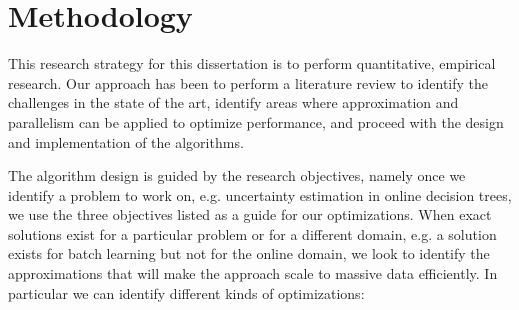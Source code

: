 \section{Methodology}

This research strategy for this dissertation is to perform quantitative, empirical research.
Our approach has been to perform a literature review to identify the challenges in the
state of the art, identify areas where approximation and parallelism can be applied to
optimize performance, and proceed with the design and implementation of the algorithms.

The algorithm design is guided by the research objectives, namely once we identify a problem
to work on, e.g. uncertainty estimation in online decision trees, we use the three objectives
listed as a guide for our optimizations. When exact solutions exist for a particular problem
or for a different domain, e.g. a solution exists for batch learning but not for the online
domain, we look to identify the approximations that will make the approach scale to massive
data efficiently. In particular we can identify different kinds of optimizations:

